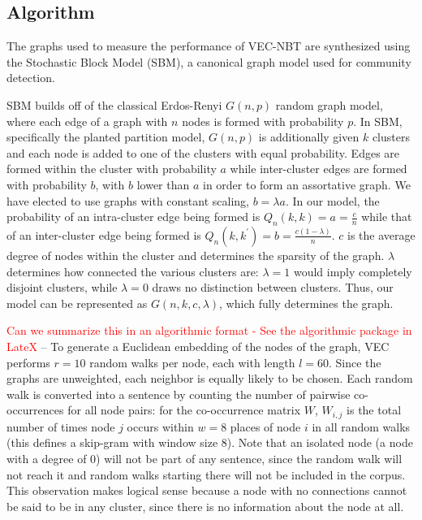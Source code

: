 \documentclass{article} %
\begin{document}
\subsection{Algorithm}

The graphs used to measure the performance of VEC-NBT are synthesized using the Stochastic Block Model (SBM), a canonical graph model used for community detection. 

SBM builds off of the classical Erdos-Renyi $G(n,p)$ random graph model, where each edge of a graph with $n$ nodes is formed with probability $p$. In SBM, specifically the planted partition model, $G(n,p)$ is additionally given $k$ clusters and each node is added to one of the clusters with equal probability. Edges are formed within the cluster with probability $a$ while inter-cluster edges are formed with probability $b$, with $b$ lower than $a$ in order to form an assortative graph. We have elected to use graphs with constant scaling, $b = \lambda a$. In our model, the probability of an intra-cluster edge being formed is $Q_n(k,k) = a = \frac{c}{n}$ while that of an inter-cluster edge being formed is $Q_n(k,k^\prime) = b = \frac{c(1-\lambda)}{n}$. $c$ is the average degree of nodes within the cluster and determines the sparsity of the graph. $\lambda$ determines how connected the various clusters are: $\lambda=1$ would imply completely disjoint clusters, while $\lambda=0$ draws no distinction between clusters.  Thus, our model can be represented as $G(n,k,c,\lambda)$, which fully determines the graph.


\textcolor{red}{Can we summarize this in an algorithmic format - See the algorithmic package in LateX} -- To generate a Euclidean embedding of the nodes of the graph, VEC performs $r = 10$ random walks per node, each with length $l = 60$. Since the graphs are unweighted, each neighbor is equally likely to be chosen. Each random walk is converted into a sentence by counting the number of pairwise co-occurrences for all node pairs: for the co-occurrence matrix $W$, $W_{i,j}$ is the total number of times node $j$ occurs within $w=8$ places of node $i$ in all random walks (this defines a skip-gram with window size 8). Note that an isolated node (a node with a degree of 0) will not be part of any sentence, since the random walk will not reach it and random walks starting there will not be included in the corpus. This observation makes logical sense because a node with no connections cannot be said to be in any cluster, since there is no information about the node at all.
\end{document}
